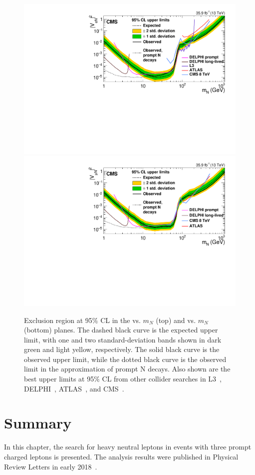 \begin{figure}[h]
\centering
\includegraphics[width=.80\textwidth]{Figures/c5/limits/CMS-EXO-17-012_Figure_002-a.pdf}\\
\includegraphics[width=.80\textwidth]{Figures/c5/limits/CMS-EXO-17-012_Figure_002-b.pdf}
\caption{Exclusion region at 95$\%$ CL in the \mixpare vs. $m_N$ (top) and \mixparm vs. $m_N$ (bottom) planes.
The dashed black curve is the expected upper limit, with one and two standard-deviation
bands shown in dark green and light yellow, respectively. The solid black curve is the observed
upper limit, while the dotted black curve is the observed limit in the approximation of
prompt N decays. Also shown are the best upper limits at 95$\%$ CL from other collider searches
in L3~\cite{ACHARD200167}, DELPHI~\cite{Abreu:1996pa}, ATLAS~\cite{Aad_2015}, and CMS~\cite{Sirunyan:2018xiv}. \willem}
\label{fig:limits}
\end{figure}

\clearpage
\section{Summary}
In this chapter, the search for heavy neutral leptons in events with
three prompt
charged leptons is presented. The analysis
results were published in Physical Review Letters in early 2018~\cite{Sirunyan:2018mtv}.

